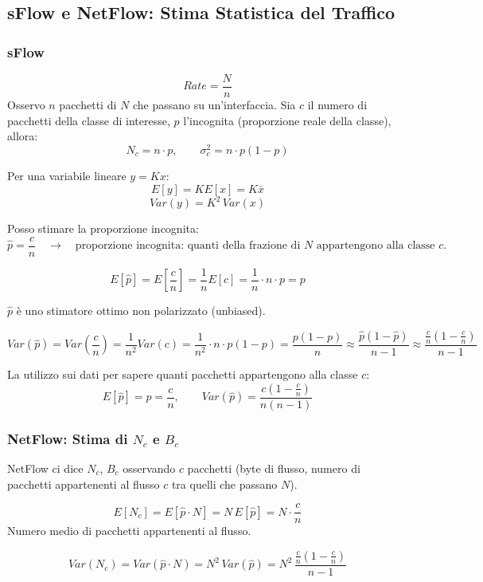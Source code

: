 \subsection{sFlow e NetFlow: Stima Statistica del Traffico}

\subsubsection{sFlow}

\[
    Rate = \frac{N}{n}
\]
Osservo $n$ pacchetti di $N$ che passano su un'interfaccia.
Sia $c$ il numero di pacchetti della classe di interesse,
$p$ l'incognita (proporzione reale della classe), allora:
\[
    N_c = n \cdot p, \qquad \sigma_c^2 = n \cdot p(1-p)
\]

Per una variabile lineare $y = Kx$:
\[
    E[y] = K E[x] = K\bar{x}
\]
\[
    Var(y) = K^2 \, Var(x)
\]

Posso stimare la proporzione incognita:
\[
    \hat{p} = \frac{c}{n}
    \quad \rightarrow \quad
    \text{proporzione incognita: quanti della frazione di }
    N \text{ appartengono alla classe } c.
\]

\[
    E[\hat{p}]
    = E\!\left[\frac{c}{n}\right]
    = \frac{1}{n} E[c]
    = \frac{1}{n} \cdot n \cdot p = p
\]

$\hat{p}$ è uno stimatore ottimo non polarizzato (unbiased).

\[
    Var(\hat{p})
    = Var\!\left(\frac{c}{n}\right)
    = \frac{1}{n^2} Var(c)
    = \frac{1}{n^2} \cdot n \cdot p(1-p)
    = \frac{p(1-p)}{n}
    \approx \frac{\hat{p}(1-\hat{p})}{n-1}
    \approx \frac{\frac{c}{n}\!\left(1-\frac{c}{n}\right)}{n-1}
\]

La utilizzo sui dati per sapere quanti pacchetti appartengono
alla classe $c$:
\[
    E[\hat{p}] = p = \frac{c}{n}, \qquad
    Var(\hat{p}) = \frac{c\!\left(1-\frac{c}{n}\right)}{n(n-1)}
\]

\subsubsection{NetFlow: Stima di $N_c$ e $B_c$}

NetFlow ci dice $N_c$, $B_c$ osservando $c$ pacchetti (byte
di flusso, numero di pacchetti appartenenti al flusso $c$
tra quelli che passano $N$).

\[
    E[N_c]
    = E[\hat{p} \cdot N]
    = N \, E[\hat{p}]
    = N \cdot \frac{c}{n}
\]
Numero medio di pacchetti appartenenti al flusso.

\[
    Var(N_c)
    = Var(\hat{p} \cdot N)
    = N^2 \, Var(\hat{p})
    = N^2 \,
      \frac{\frac{c}{n}\!\left(1-\frac{c}{n}\right)}{n-1}
\]

